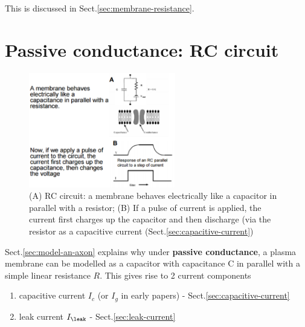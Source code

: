 This is discussed in Sect.\ref{sec:membrane-resistance}.


\section{Passive conductance: RC circuit}
\label{sec:passive-conductance}


\begin{figure}[hbt]
  \centerline{\includegraphics[height=5cm,
    angle=0]{./images/membrane-as-capacitor.eps}}
\caption{(A) RC circuit: a membrane behaves electrically like a capacitor in
parallel with a resistor; (B) If a pulse of current is applied, the
current first charges up the capacitor and then discharge (via the resistor as
a capacitive current (Sect.\ref{sec:capacitive-current})}
\label{fig:membrane-as-capacitor}
\end{figure}

Sect.\ref{sec:model-an-axon} explains why under {\bf passive conductance}, a
plasma membrane can be modelled as a capacitor with capacitance C in parallel with a
simple linear resistance $R$. This gives rise to 2 current components
\begin{enumerate}
  \item capacitive current $I_c$ (or $I_g$ in early papers) -
  Sect.\ref{sec:capacitive-current}

  \item leak current $I_\leak$ - Sect.\ref{sec:leak-current}
\end{enumerate}


